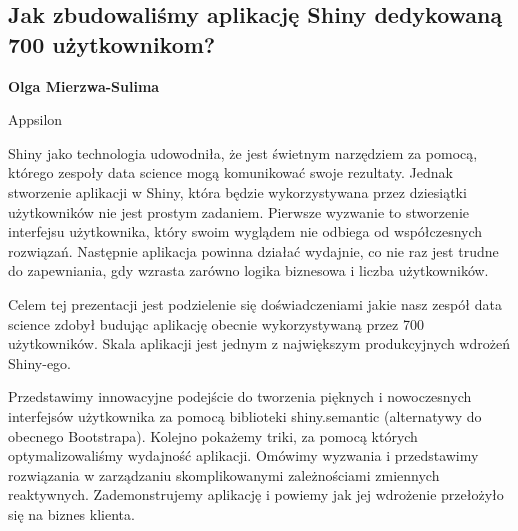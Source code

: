 \documentclass[\main/boa.tex]{subfiles}
\begin{document}
\subsection{Jak zbudowaliśmy aplikację Shiny dedykowaną 700 użytkownikom?}

\begin{minipage}{0.915\textwidth}
	\centering
  {\bf {} Olga Mierzwa-Sulima}
\end{minipage}


\begin{affiliations}
\begin{minipage}{0.915\textwidth}
\centering
Appsilon \\[-2pt]
\end{minipage}
\end{affiliations}

\vskip 0.3cm

 Shiny jako technologia udowodniła, że jest świetnym narzędziem za pomocą, którego zespoły data science mogą komunikować swoje rezultaty. Jednak stworzenie aplikacji w Shiny, która będzie wykorzystywana przez dziesiątki użytkowników nie jest prostym zadaniem. Pierwsze wyzwanie to stworzenie interfejsu użytkownika, który swoim wyglądem nie odbiega od współczesnych rozwiązań. Następnie aplikacja powinna działać wydajnie, co nie raz jest trudne do zapewniania, gdy wzrasta zarówno logika biznesowa i liczba użytkowników.
 
 Celem tej prezentacji jest podzielenie się doświadczeniami jakie nasz zespół data science zdobył budując aplikację obecnie wykorzystywaną przez 700 użytkowników. Skala aplikacji jest jednym z największym produkcyjnych wdrożeń Shiny-ego.
 
 Przedstawimy innowacyjne podejście do tworzenia pięknych i nowoczesnych interfejsów użytkownika za pomocą biblioteki shiny.semantic (alternatywy do obecnego Bootstrapa). Kolejno pokażemy triki, za pomocą których optymalizowaliśmy wydajność aplikacji. Omówimy wyzwania i przedstawimy rozwiązania w zarządzaniu skomplikowanymi zależnościami zmiennych reaktywnych. Zademonstrujemy aplikację \break i powiemy jak jej wdrożenie przełożyło się na biznes klienta.
\end{document}
